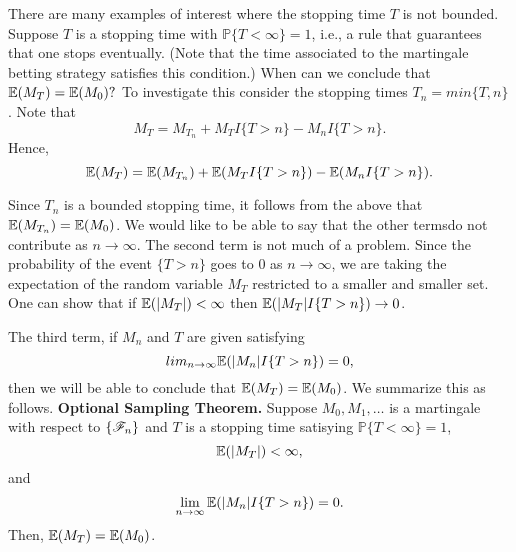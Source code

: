\documentclass[a4paper,10pt,english]{article}
\begin{document}
There are many examples of interest where the stopping time $T$ is not bounded. Suppose $T$ is a stopping time with $\mathbb{P}\{T<\infty\}=1$, i.e., a rule that guarantees that one stops eventually. (Note that the time associated to the martingale betting strategy satisfies this condition.) When can we conclude that $\mathbb{E}(M_T)=\mathbb{E}(M_0)?$ To investigate this consider the stopping times $T_n=min\{T,n\}$. Note that
\begin{equation*}
M_T=M_{T_{n}}+M_TI\{T>n\}-M_nI\{T>n\}.
\end{equation*}
Hence,
\begin{equation*}
\mathbb{E}(M_T)=\mathbb{E}(M_{T_{n}})+\mathbb{E}(M_TI\{T>n\})-\mathbb{E}(M_nI\{T>n\}).
\end{equation*}

Since $T_n$ is a bounded stopping time, it follows from the above that $\mathbb{E}(M_{T_{n}})=\mathbb{E}(M_0)$. We would like to be able to say that the other termsdo not contribute as $n\to \infty$. The second term is not much of a problem.  Since the probability of the event $\{T>n\}$ goes to 0 as $n\to \infty$, we are taking the expectation of the random variable $M_T$ restricted to a smaller and smaller set. One can show that if $\mathbb{E}(|M_T|)<\infty$ then $\mathbb{E}(|M_T|I\{T>n\}) \to 0$.

The third term, if $M_n$ and $T$ are given satisfying
\begin{equation*}
lim_{n\to \infty}\mathbb{E}(|M_n|I\{T>n\})=0,
\end{equation*}
then we will be able to conclude that $\mathbb{E}(M_T)=\mathbb{E}(M_0)$. We summarize this as follows.\newline
\textbf{Optional Sampling Theorem.} Suppose $M_0,M_1,\dots$ is a martingale with respect to $\{\mathscr{F}_n\}$ and $T$ is a stopping time satisying $\mathbb{P}\{T<\infty\}=1$,
\begin{equation*}
\mathbb{E}(|M_T|)<\infty,
\end{equation*}
and
\begin{equation*}
\lim_{n\to \infty}\mathbb{E}(|M_n|I\{T>n\})=0.
\end{equation*}
Then, $\mathbb{E}(M_T)=\mathbb{E}(M_0)$.
\end{document}
